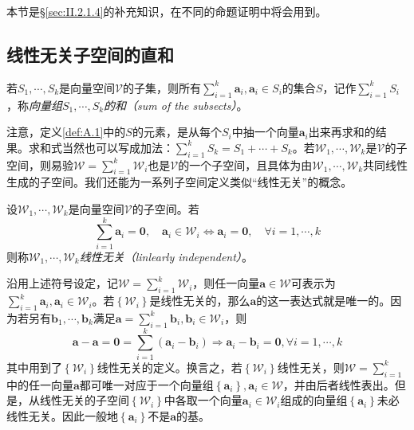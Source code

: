 \documentclass[main.tex]{subfiles}
\begin{document}
本节是\S\ref{sec:II.2.1.4}的补充知识，在不同的命题证明中将会用到。
\subsection{线性无关子空间的直和}
\begin{definition}[向量组的和]\label{def:A.1}
    若$S_1,\cdots,S_k$是向量空间$\mathcal{V}$的子集，则所有$\sum_{i=1}^k\mathbf{a}_i,\mathbf{a}_i\in S_i$的集合$S$，记作$\sum_{i=1}^k S_i$，称\emph{向量组$S_1,\cdots,S_k$的和（sum of the subsects）}。
\end{definition}

注意，定义\ref{def:A.1}中的$S$的元素，是从每个$S_i$中抽一个向量$\mathbf{a}_i$出来再求和的结果。求和式当然也可以写成加法：$\sum_{i=1}^k S_k=S_1+\cdots+S_k$。若$\mathcal{W}_1,\cdots,\mathcal{W}_k$是$\mathcal{V}$的子空间，则易验$\mathcal{W}=\sum_{i=1}^k\mathcal{W}_i$也是$\mathcal{V}$的一个子空间，且具体为由$\mathcal{W}_1,\cdots,\mathcal{W}_k$共同线性生成的子空间。我们还能为一系列子空间定义类似“线性无关”的概念。

\begin{definition}[线性无关子空间]\label{def:A.2}
    设$\mathcal{W}_1,\cdots,\mathcal{W}_k$是向量空间$\mathcal{V}$的子空间。若
    \[\sum_{i=1}^k\mathbf{a}_i=\mathbf{0},\quad\mathbf{a}_i\in\mathcal{W}_i\Leftrightarrow \mathbf{a}_i=\mathbf{0},\quad\forall i=1,\cdots,k\]
    则称$\mathcal{W}_1,\cdots,\mathcal{W}_k$\emph{线性无关（linlearly independent）}。
\end{definition}

沿用上述符号设定，记$\mathcal{W}=\sum_{i=1}^k\mathcal{W}_i$，则任一向量$\mathbf{a}\in\mathcal{W}$可表示为$\sum_{i=1}^k\mathbf{a}_i,\mathbf{a}_i\in\mathcal{W}_i$。若$\left\{\mathcal{W}_i\right\}$是线性无关的，那么$\mathbf{a}$的这一表达式就是唯一的。因为若另有$\mathbf{b}_1,\cdots,\mathbf{b}_k$满足$\mathbf{a}=\sum_{i=1}^k\mathbf{b}_i,\mathbf{b}_i\in\mathcal{W}_i$，则
\[\mathbf{a}-\mathbf{a}=\mathbf{0}=\sum_{i=1}^k\left(\mathbf{a}_i-\mathbf{b}_i\right)\Rightarrow\mathbf{a}_i-\mathbf{b}_i=\mathbf{0},\forall i=1,\cdots,k\]
其中用到了$\left\{\mathcal{W}_i\right\}$线性无关的定义。换言之，若$\left\{\mathcal{W}_i\right\}$线性无关，则$\mathcal{W}=\sum_{i=1}^k$中的任一向量$\mathbf{a}$都可唯一对应于一个向量组$\left\{\mathbf{a}_i\right\},\mathbf{a}_i\in\mathcal{W}$，并由后者线性表出。但是，从线性无关的子空间$\left\{\mathcal{W}_i\right\}$中各取一个向量$\mathbf{a}_i\in\mathcal{W}_i$组成的向量组$\left\{\mathbf{a}_i\right\}$未必线性无关。因此一般地$\left\{\mathbf{a}_i\right\}$不是$\mathbf{a}$的基。
\end{document}

